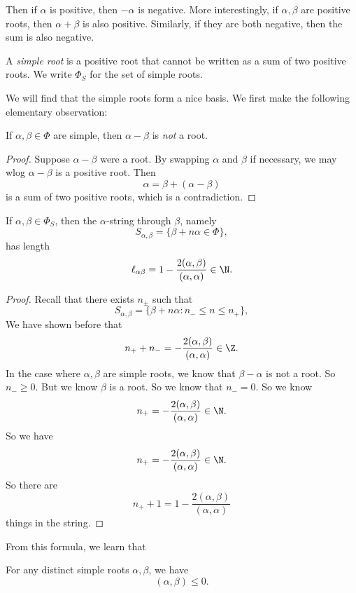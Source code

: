 \documentclass[a4paper]{article}
\begin{document}
Then if $\alpha$ is positive, then $-\alpha $ is negative. More interestingly, if $\alpha, \beta$ are positive roots, then $\alpha + \beta$ is also positive. Similarly, if they are both negative, then the sum is also negative.

\begin{defi}
  A \emph{simple root} is a positive root that cannot be written as a sum of two positive roots. We write $\Phi_S$ for the set of simple roots.
\end{defi}

We will find that the simple roots form a nice basis. We first make the following elementary observation:
\begin{prop}
  If $\alpha, \beta \in \Phi$ are simple, then $\alpha - \beta$ is \emph{not} a root.
\end{prop}

\begin{proof}
  Suppose $\alpha - \beta$ were a root. By swapping $\alpha$ and $\beta$ if necessary, we may wlog $\alpha - \beta$ is a positive root. Then
  \[
    \alpha = \beta + (\alpha - \beta)
  \]
  is a sum of two positive roots, which is a contradiction.
\end{proof}

\begin{prop}
  If $\alpha, \beta \in \Phi_S$, then the $\alpha$-string through $\beta$, namely
  \[
    S_{\alpha, \beta} = \{\beta + n \alpha \in \Phi\},
  \]
  has length
  \[
    \ell_{\alpha\beta} = 1 - \frac{2 (\alpha, \beta)}{(\alpha, \alpha)} \in \N.
  \]
\end{prop}

\begin{proof}
  Recall that there exists $n_{\pm}$ such that
  \[
    S_{\alpha, \beta} = \{\beta + n \alpha: n_- \leq n \leq n_+\},
  \]
  We have shown before that
  \[
    n_+ + n_- = - \frac{2(\alpha, \beta)}{(\alpha, \alpha)} \in \Z.
  \]
  In the case where $\alpha, \beta$ are simple roots, we know that $\beta - \alpha$ is not a root. So $n_- \geq 0$. But we know $\beta$ is a root. So we know that $n_- = 0$. So we know
  \[
    n_+ = -\frac{2(\alpha, \beta)}{(\alpha, \alpha)} \in \N.
  \]
  So we have
  \[
    n_+ = -\frac{2(\alpha, \beta)}{(\alpha, \alpha)} \in \N.
  \]
  So there are
  \[
    n_+ + 1 = 1 - \frac{2(\alpha, \beta)}{(\alpha, \alpha)}
  \]
  things in the string.
\end{proof}
From this formula, we learn that

\begin{cor}
  For any distinct simple roots $\alpha, \beta$, we have
  \[
    (\alpha, \beta) \leq 0.
  \]
\end{cor}
\end{document}

